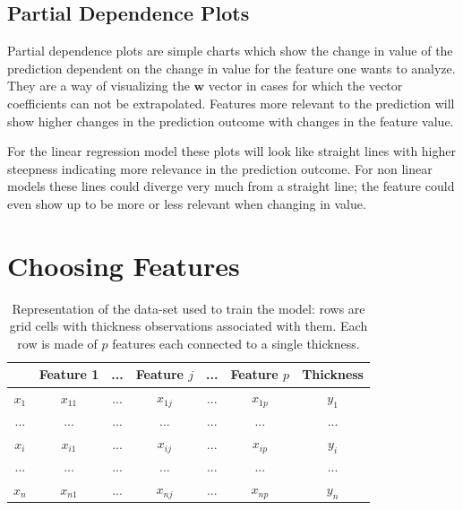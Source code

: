 \subsection{Partial Dependence Plots}
Partial dependence plots are simple charts which show the change in value of the prediction dependent on the change in value for the feature one wants to analyze. They are a way of visualizing the $\mathbf{w}$ vector in cases for which the vector coefficients can not be extrapolated. Features more relevant to the prediction will show higher changes in the prediction outcome with changes in the feature value.

For the linear regression model these plots will look like straight lines with higher steepness indicating more relevance in the prediction outcome. For non linear models these lines could diverge very much from a straight line; the feature could even show up to be more or less relevant when changing in value.  

\section{Choosing Features}\label{features}

\begin{table}
	\centering
	\caption{Representation of the data-set used to train the model: rows are grid cells with thickness observations associated with them. Each row is made of $p$ features each connected to a single thickness.}
	\label{tab:features}
	\begin{tabular}{|c|c|c|c|c|c|c|} 
		\cline{2-7}
		\multicolumn{1}{l|}{} & Feature 1 & ... & Feature $j$ & ... & Feature $p$ & Thickness \\  
		\hline
		$x_1$              & $x_{11}$ & ... & $x_{1j}$     & ... & $x_{1p}$     & $y_1$ \\   
		\hline
		...                   & ...       & ... & ...           & ... & ...           & ...    \\     
		\hline
		$x_i$              & $x_{i1}$ & ... & $x_{ij}$     & ... & $x_{ip}$     & $y_i$    \\
		\hline
		...                   & ...       & ... & ...           & ... & ...           & ...  \\       
		\hline
		$x_n$              & $x_{n1}$ & ... & $x_{nj}$     & ... & $x_{np}$     & $y_n$   \\      
		\hline
	\end{tabular}
\end{table}


